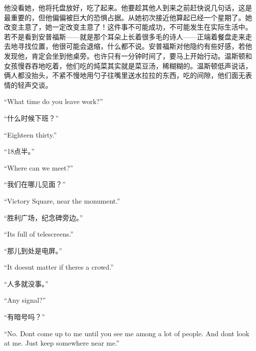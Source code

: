 \begin{paracol}{2}
\switchcolumn

他没看她，他将托盘放好，吃了起来。他要趁其他人到来之前赶快说几句话，这是最重要的，但他偏偏被巨大的恐惧占据。从她初次接近他算起已经一个星期了。她改变主意了，她一定改变主意了！这件事不可能成功，不可能发生在实际生活中。若不是看到安普福斯——就是那个耳朵上长着很多毛的诗人——正端着餐盘走来走去地寻找位置，他很可能会退缩，什么都不说。安普福斯对他隐约有些好感，若他发现他，肯定会坐到他桌旁。也许只有一分钟时间了，要马上开始行动。温斯顿和女孩慢吞吞地吃着，他们吃的炖菜其实就是菜豆汤，稀糊糊的。温斯顿低声说话，俩人都没抬头，不紧不慢地用勺子往嘴里送水拉拉的东西，吃的间隙，他们面无表情的轻声交谈。

\switchcolumn*

``What time do you leave work?''

\switchcolumn

``什么时候下班？''

\switchcolumn*

``Eighteen thirty.''

\switchcolumn

``18点半。''

\switchcolumn*

``Where can we meet?''

\switchcolumn

``我们在哪儿见面？''

\switchcolumn*

``Victory Square, near the monument.''

\switchcolumn

``胜利广场，纪念碑旁边。''

\switchcolumn*

``It\textquotesingle s full of telescreens.''

\switchcolumn

``那儿到处是电屏。''

\switchcolumn*

``It doesn\textquotesingle t matter if there\textquotesingle s a crowd.''

\switchcolumn

``人多就没事。''

\switchcolumn*

``Any signal?''

\switchcolumn

``有暗号吗？''

\switchcolumn*

``No. Don\textquotesingle t come up to me until you see me among a lot of
people. And don\textquotesingle t look at me. Just keep somewhere near
me.''


\end{paracol}

